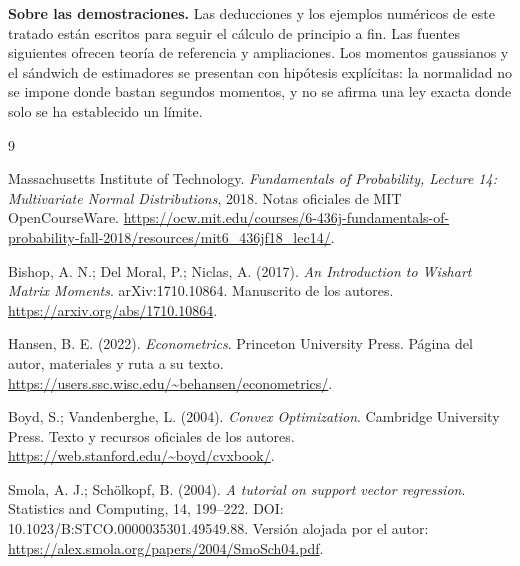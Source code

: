 \documentclass[11pt,a4paper]{article}
\theoremstyle{definition}\newtheorem{definicion}[teorema]{Definición}
\begin{document}
\textbf{Sobre las demostraciones.}
Las deducciones y los ejemplos numéricos de este tratado están escritos
para seguir el cálculo de principio a fin. Las fuentes siguientes ofrecen
teoría de referencia y ampliaciones. Los momentos gaussianos y el
sándwich de estimadores se presentan con hipótesis explícitas:
la normalidad no se impone donde bastan segundos momentos, y no se
afirma una ley exacta donde solo se ha establecido un límite.

\begingroup\small
\renewcommand{\refname}{Fuentes para profundizar}
\begin{thebibliography}{9}\raggedright
{}
Massachusetts Institute of Technology. \textit{Fundamentals of Probability,
Lecture 14: Multivariate Normal Distributions}, 2018.
Notas oficiales de MIT OpenCourseWare.
\url{https://ocw.mit.edu/courses/6-436j-fundamentals-of-probability-fall-2018/resources/mit6_436jf18_lec14/}.

Bishop, A. N.; Del Moral, P.; Niclas, A. (2017).
\textit{An Introduction to Wishart Matrix Moments}.
arXiv:1710.10864. Manuscrito de los autores.
\url{https://arxiv.org/abs/1710.10864}.

Hansen, B. E. (2022). \textit{Econometrics}. Princeton University Press.
Página del autor, materiales y ruta a su texto.
\url{https://users.ssc.wisc.edu/~behansen/econometrics/}.

Boyd, S.; Vandenberghe, L. (2004).
\textit{Convex Optimization}. Cambridge University Press.
Texto y recursos oficiales de los autores.
\url{https://web.stanford.edu/~boyd/cvxbook/}.

Smola, A. J.; Schölkopf, B. (2004).
\textit{A tutorial on support vector regression}.
Statistics and Computing, 14, 199--222.
DOI: 10.1023/B:STCO.0000035301.49549.88.
Versión alojada por el autor:
\url{https://alex.smola.org/papers/2004/SmoSch04.pdf}.
\end{thebibliography}
\endgroup
\end{document}
